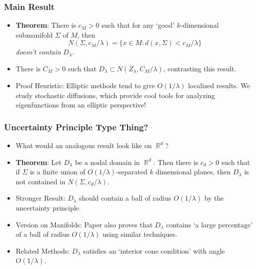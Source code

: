 \documentclass[usenames,dvipsnames,12pt]{beamer}
\DeclareMathOperator{\RR}{\mathbb{R}}
\begin{document}
\begin{frame}
    \frametitle{Main Result}

    \begin{itemize}
        \item {\bf Theorem}: There is $c_M > 0$ such that for any `good' $k$-dimensional submanifold $\Sigma$ of $M$, then
        \[ N(\Sigma, c_M / \lambda) = \{ x \in M : d(x,\Sigma) < c_M / \lambda \} \]
        \emph{doesn't contain} $D_\lambda$.


        \pause
        \item There is $C_M > 0$ such that $D_\lambda \subset N(Z_\lambda, C_M/\lambda)$, contrasting this result.

        \pause
        \item Proof Heuristic: Elliptic methods tend to give $O(1/\lambda)$ localized results. We study stochastic diffusions, which provide cool tools for analyzing eigenfunctions from an elliptic perspective!
    \end{itemize}
\end{frame}

\begin{frame}
    \frametitle{Uncertainty Principle Type Thing?}

    \begin{itemize}
        \item What would an analogous result look like on $\RR^d$?
        \pause

        \item {\bf Theorem}: Let $D_\lambda$ be a nodal domain in $\RR^d$. Then there is $c_d > 0$ such that if $\Sigma$ is a finite union of $O(1/\lambda)$-separated $k$ dimensional planes, then $D_\lambda$ is not contained in $N(\Sigma, c_d / \lambda)$.
        \pause

        \item Stronger Result: $D_\lambda$ should contain a ball of radius $O(1/\lambda)$ by the uncertainty principle.


        \pause
        \item Version on Manifolds: Paper also proves that $D_\lambda$ contains `a large percentage' of a ball of radius $O(1/\lambda)$ using similar techniques.

        \pause
        \item Related Methods: $D_\lambda$ satisfies an `interior cone condition' with angle $O(1/\lambda)$.
    \end{itemize}
\end{frame}
\end{document}
